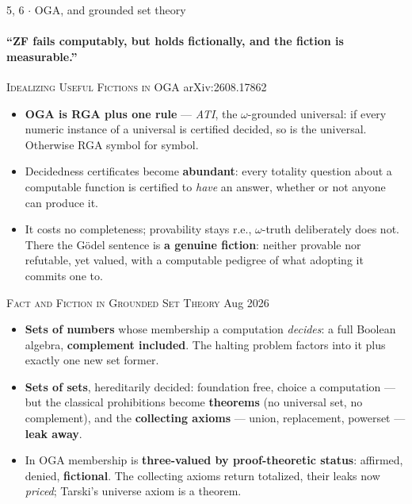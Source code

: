 \documentclass[aspectratio=169,11pt]{beamer}
\newcommand{\key}[1]{{\color{accent}\textbf{#1}}}
\newcommand{\bad}[1]{{\color{warn}\textbf{#1}}}
\begin{document}
\begin{frame}{5, 6 $\cdot$ OGA, and grounded set theory}
  \framesubtitle{``ZF fails computably, but holds fictionally, and the fiction is
                   measurable.''}
  \vspace{-0.3em}
  {\footnotesize\color{soft}\textsc{Idealizing Useful Fictions in OGA}
   \hfill arXiv:2608.17862}
  \footnotesize
  \begin{itemize}\itemsep0.15em
    \item \key{OGA is RGA plus one rule} --- \emph{ATI}, the $\omega$-grounded
          universal: if every numeric instance of a universal is certified decided,
          so is the universal. Otherwise RGA symbol for symbol.
    \item Decidedness certificates become \key{abundant}: every totality question about
          a computable function is certified to \emph{have} an answer, whether or not
          anyone can produce it.
    \item It costs no completeness; provability stays r.e., $\omega$-truth deliberately
          does not. There the G\"odel sentence is \key{a genuine fiction}: neither
          provable nor refutable, yet valued, with a computable pedigree of what
          adopting it commits one to.
  \end{itemize}
  \vspace{0.6em}
  {\footnotesize\color{soft}\textsc{Fact and Fiction in Grounded Set Theory}
   \hfill Aug 2026}
  \begin{itemize}\itemsep0.15em
    \item \key{Sets of numbers} whose membership a computation \emph{decides}: a full
          Boolean algebra, \key{complement included}. The halting problem factors into
          it plus exactly one new set former.
    \item \key{Sets of sets}, hereditarily decided: foundation free, choice a
          computation --- but the classical prohibitions become \key{theorems} (no
          universal set, no complement), and the \bad{collecting axioms} --- union,
          replacement, powerset --- \bad{leak away}.
    \item In OGA membership is \key{three-valued by proof-theoretic status}: affirmed,
          denied, \key{fictional}. The collecting axioms return totalized, their leaks
          now \emph{priced}; Tarski's universe axiom is a theorem.
  \end{itemize}
\end{frame}
\end{document}
